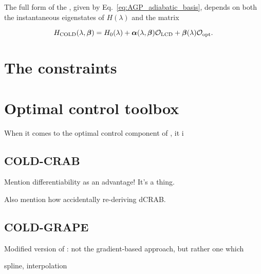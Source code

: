 The full form of the , given by Eq.~\eqref{eq:AGP_adiabatic_basis}, depends on both the instantaneous eigenstates of $H(\lambda)$ and the matrix 


\begin{equation}\label{eq:expandedH}
H_{\rm COLD}(\lambda,\boldsymbol{\beta}) = H_0(\lambda) + {\boldsymbol \alpha}(\lambda,\boldsymbol{\beta}) \mathcal{O}_{\rm LCD} + \boldsymbol{\beta}(\lambda) \mathcal{O}_{\rm opt}.
\end{equation}

\section{The constraints}

\section{Optimal control toolbox}

When it comes to the optimal control component of , it i 

\subsection{COLD-CRAB}

Mention differentiability as an advantage! It's a thing.

Also mention how accidentally re-deriving dCRAB.

\subsection{COLD-GRAPE}

Modified version of : not the gradient-based approach, but rather one which 

spline, interpolation